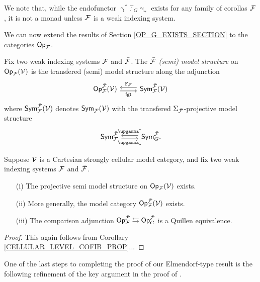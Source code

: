 \documentclass[a4paper,10pt]{article}%
\begin{document}
\begin{remark}
  We note that, while the endofunctor $\upgamma^* \mathbb F_G \upgamma_*$ exists for any family of corollas $\mathcal F$, it is not a monad unless $\mathcal F$ is a weak indexing system.
\end{remark}

We can now extend the results of Section \ref{OP_G_EXISTS_SECTION} to the categories $\mathsf{Op}_{\mathcal F}$. 

\begin{definition}
  Fix two weak indexing systems $\mathcal F$ and $\bar{\mathcal F}$.
  The \textit{$\bar{\mathcal F}$ (semi) model structure} on $\mathsf{Op}_{\mathcal F}(\mathcal V)$ is the transfered (semi) model structure along the adjunction
  \[
  \begin{tikzcd}
    \Op_\F^{\bar \F}(\V) \arrow[r, shift right, "\mathsf{fgt}"'] & \Sym_\F^{\bar \F}(\V) \arrow[l, shift right, "\mathbb F_\F"']
  \end{tikzcd}
  \]
where $\mathsf{Sym}_{\mathcal F}^{\bar {\mathcal F}}(\mathcal V)$ denotes $\mathsf{Sym}_{\mathcal F}(\mathcal V)$ with the transfered $\Sigma_{\bar {\mathcal F}}$-projective model structure
\[
\begin{tikzcd}
  \Sym_\F^{\bar \F} \arrow[r, shift right, "\upgamma_*"'] & \Sym_G^{\bar \F} \arrow[l, shift right, "\upgamma^*"']. 
\end{tikzcd}
\]
\end{definition}

\begin{corollary}
  Suppose $\mathcal V$ is a Cartesian strongly cellular model category, and fix two weak indexing systems $\mathcal F$ and $\bar {\mathcal F}$.
  \begin{enumerate}
  \item[(i)] The projective semi model structure on $\mathsf{Op}_{\mathcal F}(\mathcal V)$ exists.
  \item[(ii)] More generally, the model category $\mathsf{Op}_{\mathcal F}^{\bar{\mathcal F}}(\mathcal V)$ exists.
\item[(iii)] The comparison adjunction $\mathsf{Op}_{\mathcal F}^{\bar {\mathcal F}} \leftrightarrows \mathsf{Op}_G^{\bar {\mathcal F}}$ is a Quillen equivalence.
  \end{enumerate}
\end{corollary}
\begin{proof}
 This again follows from Corollary \ref{CELLULAR_LEVEL_COFIB_PROP}...
\end{proof}


One of the last steps to completing the proof of our Elmendorf-type result is the following refinement of the key argument in the proof of
\cite[Thm. 2.10]{Ste16}.
\end{document}
